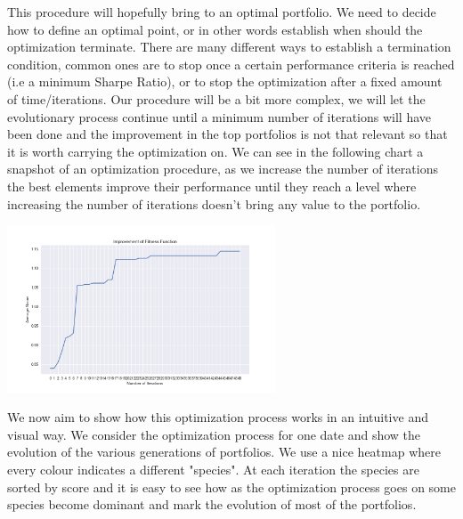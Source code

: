 This procedure will hopefully bring to an optimal portfolio. We need to decide how to define an optimal point, or in other words establish when should the optimization terminate. There are many different ways to establish a termination condition, common ones are to stop once a certain performance criteria is reached (i.e a minimum Sharpe Ratio), or to stop the optimization after a fixed amount of time/iterations. Our procedure will be a bit more complex, we will let the evolutionary process continue until a minimum number of iterations will have been done and the improvement in the top portfolios is not that relevant so that it is worth carrying the optimization on. We can see in the following chart a snapshot of an optimization procedure, as we increase the number of iterations the best elements improve their performance until they reach a level where increasing the number of iterations doesn't bring any value to the portfolio.\\

\begin{center}
	\centering
	\includegraphics[width=0.6\textwidth]{Genetic_Algo/Fitness_function.png}
	\label{Fitness_func}
\end{center}


We now aim to show how this optimization process works in an intuitive and visual way. We consider the optimization process for one date and show the evolution of the various generations of portfolios. We use a nice heatmap where every colour indicates a different "species". At each iteration the species are sorted by score and it is easy to see how as the optimization process goes on some species become dominant and mark the evolution of most of the portfolios.

